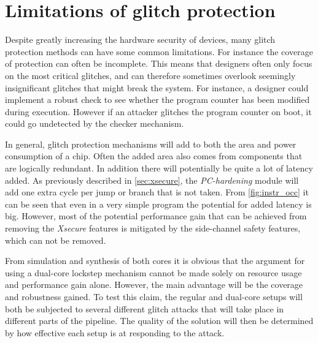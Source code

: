 \section{Limitations of glitch protection}
\label{sec:limits}

Despite greatly increasing the hardware security of devices, many glitch protection methods can have some common limitations. For instance the coverage of protection can often be incomplete. This means that designers often only focus on the most critical glitches, and can therefore sometimes overlook seemingly insignificant glitches that might break the system. For instance, a designer could implement a robust check to see whether the program counter has been modified during execution. However if an attacker glitches the program counter on boot, it could go undetected by the checker mechanism. 

In general, glitch protection mechanisms will add to both the area and power consumption of a chip. Often the added area also comes from components that are logically redundant. In addition there will potentially be quite a lot of latency added. As previously described in \autoref{sec:xsecure}, the \textit{PC-hardening} module will add one extra cycle per jump or branch that is not taken. From \autoref{fig:instr_occ} it can be seen that even in a very simple program the potential for added latency is big. However, most of the potential performance gain that can be achieved from removing the \textit{Xsecure} features is mitigated by the side-channel safety features, which can not be removed. 

From simulation and synthesis of both cores it is obvious that the argument for using a dual-core lockstep mechanism cannot be made solely on resource usage and performance gain alone. However, the main advantage will be the coverage and robustness gained. To test this claim, the regular and dual-core setups will both be subjected to several different glitch attacks that will take place in different parts of the pipeline. The quality of the solution will then be determined by how effective each setup is at responding to the attack. 



